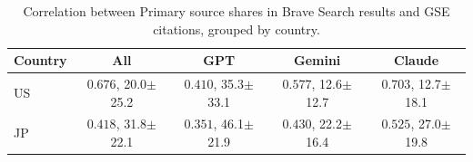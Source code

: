 \begin{table}[t]
\centering
\footnotesize
\setlength{\tabcolsep}{2.2pt}
\caption{Correlation between Primary source shares in Brave Search results and GSE citations, grouped by country.}
\label{tab:brave-gse-primary-share-correlation-country}
\begin{tabular}{lcccc}
\toprule
\textbf{Country} & \textbf{All} & \textbf{GPT} & \textbf{Gemini} & \textbf{Claude} \\
\midrule
US & \textcolor{red!70!black}{$0.676$}, 20.0$\pm$25.2 & \textcolor{red!50!black}{$0.410$}, 35.3$\pm$33.1 & \textcolor{red!70!black}{$0.577$}, 12.6$\pm$12.7 & \textcolor{red!90!black}{$0.703$}, 12.7$\pm$18.1 \\
JP & \textcolor{red!50!black}{$0.418$}, 31.8$\pm$22.1 & \textcolor{red!50!black}{$0.351$}, 46.1$\pm$21.9 & \textcolor{red!50!black}{$0.430$}, 22.2$\pm$16.4 & \textcolor{red!70!black}{$0.525$}, 27.0$\pm$19.8 \\
\bottomrule
\end{tabular}
\end{table}
